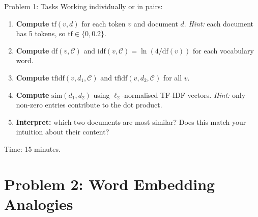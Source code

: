 \documentclass[9pt,t]{beamer}
\begin{document}
\begin{frame}{Problem 1: Tasks}
  Working individually or in pairs:
  \medskip
  \begin{enumerate}
    \item \textbf{Compute} $\mathrm{tf}(v, d)$ for each token $v$ and document $d$.
          \textit{Hint:} each document has 5 tokens, so $\mathrm{tf} \in \{0, 0.2\}$.
    \medskip
    \item \textbf{Compute} $\mathrm{df}(v, \mathcal{C})$ and
          $\mathrm{idf}(v, \mathcal{C}) = \ln(4 / \mathrm{df}(v))$ for each vocabulary word.
    \medskip
    \item \textbf{Compute} $\mathrm{tfidf}(v, d_1, \mathcal{C})$ and
          $\mathrm{tfidf}(v, d_2, \mathcal{C})$ for all $v$.
    \medskip
    \item \textbf{Compute} $\mathrm{sim}(d_1, d_2)$ using $\ell_2$-normalised TF-IDF vectors.
          \textit{Hint:} only non-zero entries contribute to the dot product.
    \medskip
    \item \textbf{Interpret:} which two documents are most similar? Does this match
          your intuition about their content?
  \end{enumerate}
  \medskip
  \small Time: 15 minutes.
\end{frame}

\section{Problem 2: Word Embedding Analogies}
\end{document}
